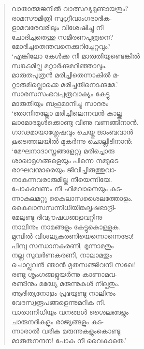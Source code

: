 \begin{verse}
വാതാത്മജനില്‍ വാത്സല്യമുണ്ടായതും?\\
രാമസൗമിത്രി സുഗ്രീവാംഗദാദിക-\\
ളാമവരേവരിലും വിശേഷിച്ചു നീ\\
ചോദിച്ചതെന്തു സമീരണപുത്രനെ?\\
മോദിച്ചതെന്തവനെക്കുറിച്ചേറ്റവും?\\
‘എങ്കിലോ കേള്‍ക്ക നീ മാരുതിയുണ്ടെങ്കില്‍\\
സങ്കടമില്ല മറ്റാര്‍ക്കുമറിഞ്ഞാലും.\\
മാരുതപുത്രന്‍ മരിച്ചിതെന്നാകില്‍ മ-\\
റ്റാരുമില്ലൊക്കെ മരിച്ചതിനൊക്കുമേ.’\\
സാരസസംഭവപുത്രവാക്യം കേട്ടു\\
മാരുതിയും ബഹുമാനിച്ചു സാദരം\\
‘ഞാനിതല്ലോ മരിച്ചീലെന്നവന്‍ കാല്ക്ക-\\
ലാമോദമുള്‍ക്കൊണ്ടു വീണു വണങ്ങിനാന്‍.\\
ഗാഢമായാശ്ലേഷവും ചെയ്തു ജാംബവാന്‍\\
കൂടെത്തലയില്‍ മുകര്‍ന്നു ചൊല്ലീടിനാന്‍:\\
‘മേഘനാദാസ്ത്രങ്ങളേറ്റു മരിച്ചൊരു\\
ശാഖാമൃഗങ്ങളെയും പിന്നെ നമ്മുടെ\\
രാഘവന്മാരെയും ജീവിച്ചിരുത്തുവാ-\\
നാകുന്നവരാരുമില്ല നീയെന്നിയേ.\\
പോകവേണം നീ ഹിമവാനെയും കട-\\
ന്നാകുലമറ്റു കൈലാസശൈലത്തോളം.\\
കൈലാസസന്നിധിയിങ്കലൃഷഭാദ്രി-\\
മേലുണ്ടു ദിവ്യൗഷധങ്ങളവറ്റിനു\\
നാലിനും നാമങ്ങളും കേട്ടുകൊള്ളുക.\\
മുമ്പില്‍ വിശല്യകരണിയെന്നൊന്നെടോ!\\
പിമ്പു സന്ധാനകരണി, മൂന്നാമതും\\
നല്ല സുവര്‍ണകരണി, നാലാമതും\\
ചൊല്ലുവന്‍ ഞാന്‍ മൃതസഞ്ജീവനി സഖേ!\\
രണ്ടു ശൃംഗങ്ങളുയര്‍ന്നു കാണാമവ-\\
രണ്ടിനും മദ്ധ്യേ മരുന്നുകള്‍ നില്പതും.\\
ആദിത്യനോളം പ്രഭയുണ്ടു നാലിനും\\
വേദസ്വരൂപങ്ങളെന്നുമറിക നീ.\\
വാരാന്നിധിയും വനങ്ങള്‍ ശൈലങ്ങളും\\
ചാരുനദികളും രാജ്യങ്ങളും കട-\\
ന്നാരാല്‍ വരിക മരുന്നുകളുംകൊണ്ടു\\
മാരുതനന്ദന! പോക നീ വൈകാതെ.’\\

\end{verse}
